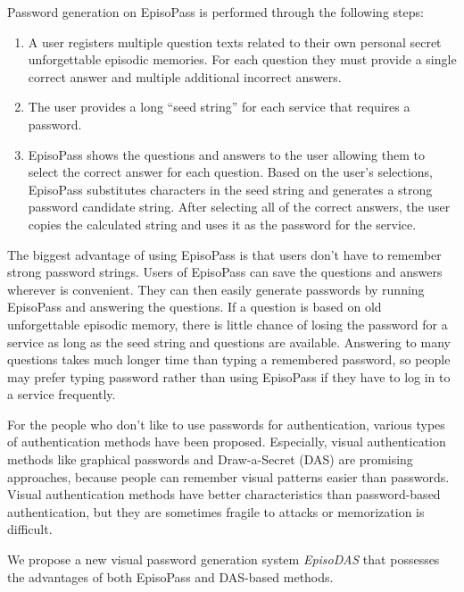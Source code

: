 \documentclass[sigconf]{acmart}
\begin{document}
Password generation on EpisoPass is performed through the following steps:

\begin{enumerate}
\item A user registers multiple question texts related to their own personal
secret unforgettable episodic memories. For each question they must provide
a single correct answer and multiple additional incorrect answers.

\item The user provides a long ``seed string'' for each service that requires
a password.

\item EpisoPass shows the questions and answers to the user allowing
them to select the correct answer for each question.
Based on the user's selections,
EpisoPass substitutes characters in the seed string and generates a
strong password candidate string.
After selecting all of the correct answers,
the user copies the calculated string
and uses it as the password for the service.
\end{enumerate}

The biggest advantage of using EpisoPass is that
users don't have to remember strong password strings.
%
Users of EpisoPass can save the questions and answers
wherever is convenient. They can
then easily generate passwords by running
EpisoPass and answering the questions.
%
If a question is based on old unforgettable episodic memory,
there is little chance of losing the password for a service
as long as the seed string and questions are available.
%
Answering to many questions takes much longer time than typing a
remembered password, so people may prefer typing password
rather than using EpisoPass if they have to log in to a service frequently.

For the people who don't like to use passwords for authentication,
various types of authentication methods have been proposed.
Especially, visual authentication methods
like graphical passwords \cite{Biddle:2012:GPL:2333112.2333114}\cite{GraphicalPasswords}
and Draw-a-Secret (DAS) \cite{Jermyn:1999:DAG:1251421.1251422} are promising approaches, because
people can remember visual patterns easier than passwords.
%
Visual authentication methods have better characteristics than
password-based authentication, but
they are sometimes fragile to attacks or memorization is difficult.

We propose a new visual password generation system \textit{EpisoDAS}
that possesses the advantages of both EpisoPass and DAS-based methods.
\end{document}
